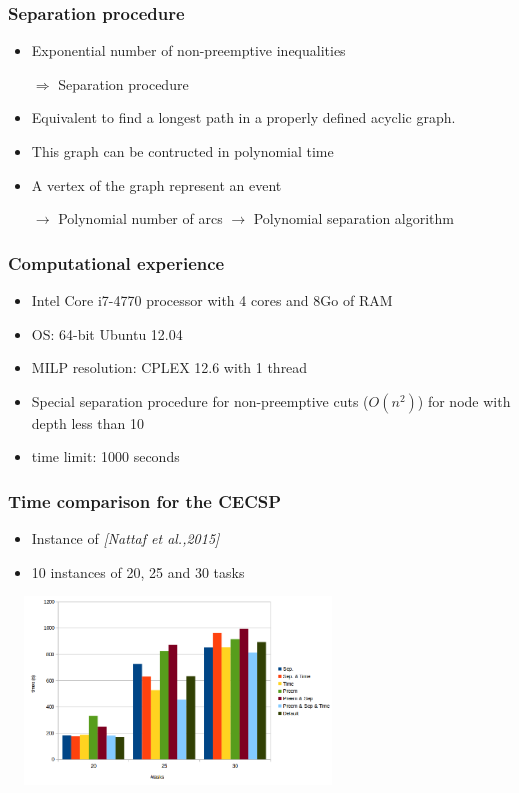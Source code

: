 \begin{frame}
\frametitle{Separation procedure}
\vfill
\begin{itemize}
\item  Exponential number of non-preemptive inequalities

$\Rightarrow$ Separation procedure
\vfill
\item Equivalent to find a longest path in a properly defined acyclic
  graph. 
\vfill
\item This graph can be contructed in polynomial time
\vfill
\item A vertex of the graph represent an event
 \vspace{0.3cm}

 $\longrightarrow$ Polynomial number of arcs 
 \vfill 
 $\longrightarrow$ Polynomial separation algorithm
\end{itemize}
\end{frame}

\begin{frame}
\frametitle{Computational experience}
\begin{itemize}
\vfill
\item Intel Core i7-4770 processor with 4 cores and 8Go of RAM
\vfill
\item OS: 64-bit Ubuntu 12.04
\vfill
\item MILP resolution: CPLEX 12.6 with 1 thread  
\vfill
\item Special separation procedure for non-preemptive cuts ($O(n^2)$)
  for node with depth less than 10
\vfill
\item time limit: 1000 seconds
\vfill
\end{itemize}
\end{frame}

\begin{frame}
\frametitle{Time comparison for the CECSP}
\begin{itemize}
\item Instance of {\it [Nattaf et al.,2015]}
\item 10 instances of 20, 25 and 30 tasks
\end{itemize}
\vfill
\begin{center}
\includegraphics[height=5cm, width=9cm]{time_CECSP.png}
\end{center}
\end{frame}


